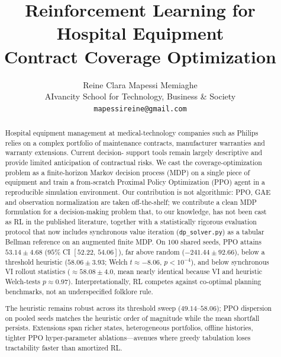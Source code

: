 \documentclass{article}
\title{Reinforcement Learning for Hospital Equipment\\
       Contract Coverage Optimization}
\author{%
  Reine Clara Mapessi Memiaghe \\
  AIvancity School for Technology, Business \& Society \\
  \texttt{mapessireine@gmail.com}
}
\begin{document}
\maketitle

\begin{abstract}
Hospital equipment management at medical-technology companies such as
Philips relies on a complex portfolio of maintenance contracts,
manufacturer warranties and warranty extensions. Current decision-
support tools remain largely descriptive and provide limited
anticipation of contractual risks. We cast the coverage-optimization
problem as a finite-horizon Markov decision process (MDP) on a single
piece of equipment and train a from-scratch Proximal Policy Optimization
(PPO) agent in a reproducible simulation environment. Our contribution
is not algorithmic: PPO, GAE and observation normalization are taken
off-the-shelf; we contribute a clean MDP formulation for a
decision-making problem that, to our knowledge, has not been cast as RL
in the published literature, together with a statistically rigorous evaluation
protocol that now includes synchronous value iteration (\texttt{dp\_solver.py})
as a tabular Bellman reference on an augmented finite MDP. On $100$ shared seeds,
PPO attains $53.14 \pm 4.68$ ($95\%$ CI $[52.22,\,54.06]$), far above random
($-241.44 \pm 92.66$), below a threshold heuristic ($58.06 \pm 3.93$; Welch
$t \approx{-}8.06$, $p < 10^{-4}$), and below synchronous VI rollout
statistics (${\approx}58.08 \pm 4.0$, mean nearly identical because VI and heuristic
Welch-tests $p \approx 0.97$). Interpretationally, RL competes against co-optimal
planning benchmarks, not an underspecified folklore rule.

The heuristic remains robust across its threshold sweep ($49.14$--$58.06$); PPO dispersion on pooled seeds matches the heuristic order of magnitude while the mean shortfall persists. Extensions span richer states, heterogeneous portfolios,
offline histories, tighter PPO hyper-parameter ablations---avenues where greedy tabulation loses tractability faster than amortized RL.
\end{abstract}








{\small


}
\end{document}
